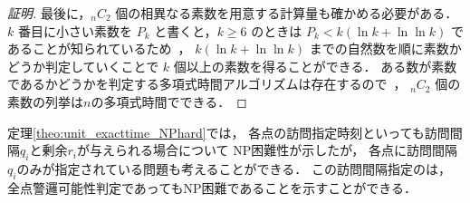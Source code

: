 \begin{proof}[証明]
  最後に，${}_n C_2$ 個の相異なる素数を用意する計算量も確かめる必要がある．
  $k$ 番目に小さい素数を $P_k$ と書くと，$k \geq 6$ のときは
  $P_k < k( \ln k + \ln\ln k )$ であることが知られているため~\cite{dusart1999k}，
  $k( \ln k + \ln\ln k )$ までの自然数を順に素数かどうか判定していくことで
  $k$ 個以上の素数を得ることができる．
  ある数が素数であるかどうかを判定する多項式時間アルゴリズムは存在するので~\cite{agrawal2004primes}，
  ${}_n C_2$ 個の素数の列挙は$n$の多項式時間でできる．
\end{proof}



定理\ref{theo:unit_exacttime_NPhard}では，
各点の訪問指定時刻といっても訪問間隔$q_i$と剰余$r_i$が与えられる場合について
NP困難性が示したが，
各点に訪問間隔$q_i$のみが指定されている問題も考えることができる．
この訪問間隔指定の{\patProb}は，
全点警邏可能性判定であってもNP困難であることを示すことができる．





